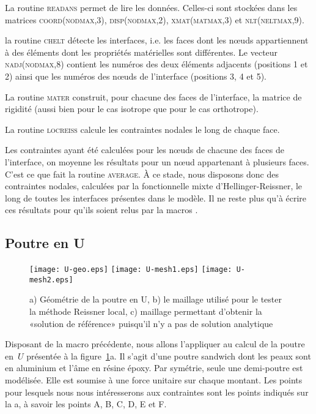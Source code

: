 La routine \textsc{readans} permet de lire les données. Celles-ci sont stockées dans les matrices \textsc{coord(nodmax,3), disp(nodmax,2), xmat(matmax,3)} et \textsc{nlt(neltmax,9)}.

\medskip
la routine \textsc{chelt} détecte les interfaces, i.e. les faces dont les nœuds appartiennent à des éléments dont les propriétés matérielles sont différentes.
Le vecteur \textsc{nadj(nodmax,8)} contient les numéros des deux éléments adjacents (positions 1 et 2) ainsi que les numéros des nœuds de l'interface (positions 3, 4 et 5).

\medskip
La routine \textsc{mater} construit, pour chacune des faces de l'interface, la matrice de rigidité (aussi bien pour le cas isotrope que pour le cas orthotrope).

\medskip
La routine \textsc{locreiss} calcule les contraintes nodales le long de chaque face.

\medskip
Les contraintes ayant été calculées pour les nœuds de chacune des faces de l'interface, on moyenne les résultats pour un nœud appartenant à plusieurs faces. C'est ce que fait la routine \textsc{average}. À ce stade, nous disposons donc des contraintes nodales, calculées par la fonctionnelle mixte d'Hellinger-Reissner, le long de toutes les interfaces présentes dans le modèle. Il ne reste plus qu'à écrire ces résultats pour qu'ils soient relus par la macros \ansys.




\medskip
\subsection{Poutre en U}

\begin{figure}[ht]
  \texttt{[image: U-geo.eps]} \hfill
  \texttt{[image: U-mesh1.eps]}\hfill
  \texttt{[image: U-mesh2.eps]}
  \caption{\label{Fig-poutU-geo} a) Géométrie de la poutre en U, b) le maillage utilisé pour le tester la méthode Reissner local, c) maillage permettant d'obtenir la «solution de référence» puisqu'il n'y a pas de solution analytique}
\end{figure}

Disposant de la macro précédente, nous allons l'appliquer au calcul de la poutre en~$U$ présentée à la figure~\ref{Fig-poutU-geo}a.
Il s'agit d'une poutre sandwich dont les peaux sont en aluminium et l'âme en résine époxy. Par symétrie, seule une demi-poutre est modélisée. Elle est soumise à une force unitaire sur chaque montant.
Les points pour lesquels nous nous intéresserons aux contraintes sont les points indiqués sur la a, à savoir les points A, B, C, D, E et F.


